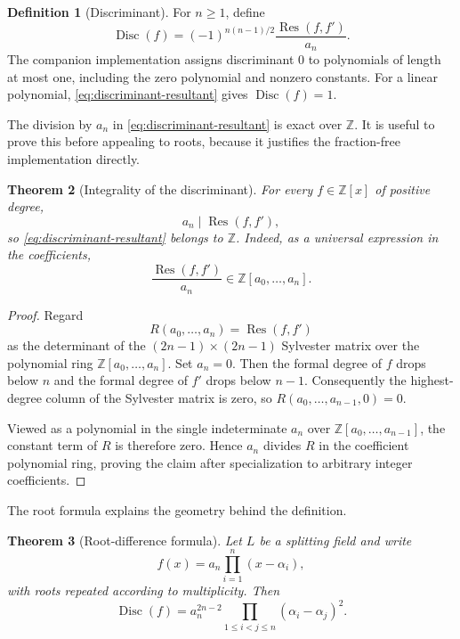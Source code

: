 \documentclass[11pt]{book}
\newtheorem{theorem}{Theorem}[section]
\theoremstyle{definition}
\newtheorem{definition}[theorem]{Definition}
\newcommand{\ZZ}{\mathbb Z}
\begin{document}
\begin{definition}[Discriminant]\label{def:discriminant}
For $n\ge1$, define
\begin{equation}\label{eq:discriminant-resultant}
 \operatorname{Disc}(f)
 =(-1)^{n(n-1)/2}\frac{\operatorname{Res}(f,f')}{a_n}.
\end{equation}
The companion implementation assigns discriminant $0$ to polynomials of
length at most one, including the zero polynomial and nonzero constants.
For a linear polynomial, \eqref{eq:discriminant-resultant} gives
$\operatorname{Disc}(f)=1$.
\end{definition}

The division by $a_n$ in \eqref{eq:discriminant-resultant} is exact over
$\ZZ$.  It is useful to prove this before appealing to roots, because it
justifies the fraction-free implementation directly.

\begin{theorem}[Integrality of the discriminant]\label{thm:discriminant-integral}
For every $f\in\ZZ[x]$ of positive degree,
\[
 a_n\mid\operatorname{Res}(f,f'),
\]
so \eqref{eq:discriminant-resultant} belongs to $\ZZ$.
Indeed, as a universal expression in the coefficients,
\[
 \frac{\operatorname{Res}(f,f')}{a_n}
 \in\ZZ[a_0,\ldots,a_n].
\]
\end{theorem}

\begin{proof}
Regard
\[
 R(a_0,\ldots,a_n)=\operatorname{Res}(f,f')
\]
as the determinant of the $(2n-1)\times(2n-1)$ Sylvester matrix over the
polynomial ring $\ZZ[a_0,\ldots,a_n]$.  Set $a_n=0$.  Then the formal degree
of $f$ drops below $n$ and the formal degree of $f'$ drops below $n-1$.
Consequently the highest-degree column of the Sylvester matrix is zero, so
$R(a_0,\ldots,a_{n-1},0)=0$.

Viewed as a polynomial in the single indeterminate $a_n$ over
$\ZZ[a_0,\ldots,a_{n-1}]$, the constant term of $R$ is therefore zero.
Hence $a_n$ divides $R$ in the coefficient polynomial ring, proving the
claim after specialization to arbitrary integer coefficients.
\end{proof}

The root formula explains the geometry behind the definition.

\begin{theorem}[Root-difference formula]\label{thm:discriminant-root-formula}
Let $L$ be a splitting field and write
\[
 f(x)=a_n\prod_{i=1}^n(x-\alpha_i),
\]
with roots repeated according to multiplicity.  Then
\begin{equation}\label{eq:discriminant-root-formula}
 \operatorname{Disc}(f)
 =a_n^{2n-2}\prod_{1\le i<j\le n}(\alpha_i-\alpha_j)^2.
\end{equation}
\end{theorem}
\end{document}
